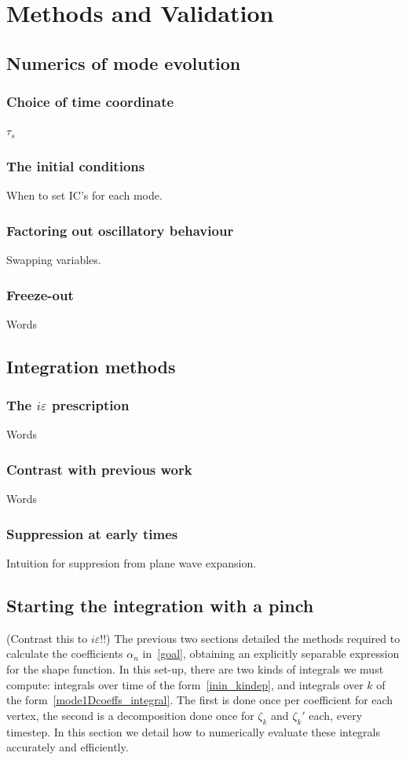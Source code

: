 \chapter{Methods and Validation}\label{chapter:methods}
\section{Numerics of mode evolution}
    \subsection{Choice of time coordinate}
    $\tau_s$
    \subsection{The initial conditions}
    When to set IC's for each mode.
    \subsection{Factoring out oscillatory behaviour}
    Swapping variables.
    \subsection{Freeze-out}
    Words
\section{Integration methods}
    \subsection{The $i\varepsilon$ prescription}
    Words
    \subsection{Contrast with previous work}
    Words
    \subsection{Suppression at early times}
    Intuition for suppresion from plane wave expansion.
\section{Starting the integration with a pinch}
(Contrast this to $i\varepsilon$!!)
The previous two sections detailed the methods required to calculate
the coefficients $\alpha_n$ in~\eqref{goal}, obtaining an
explicitly separable expression for the shape function.
In this set-up,
there are two kinds of integrals we must compute: integrals over time of
the form~\eqref{inin_kindep}, and integrals over $k$ of the form~\eqref{mode1Dcoeffs_integral}.
The first is done once per coefficient for each vertex, the second is a decomposition
done once for $\zeta_k$ and $\zeta_k'$ each, every timestep.
In this section we detail how to numerically evaluate these
integrals accurately and efficiently.


